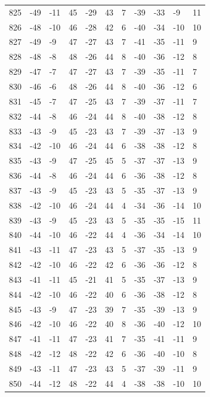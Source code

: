 \begin{table}[H]
\begin{tabular}{lllllllllll}
825 & -49 & -11 & 45 & -29 & 43 & 7 & -39 & -33 & -9 & 11 \\
826 & -48 & -10 & 46 & -28 & 42 & 6 & -40 & -34 & -10 & 10 \\
827 & -49 & -9 & 47 & -27 & 43 & 7 & -41 & -35 & -11 & 9 \\
828 & -48 & -8 & 48 & -26 & 44 & 8 & -40 & -36 & -12 & 8 \\
829 & -47 & -7 & 47 & -27 & 43 & 7 & -39 & -35 & -11 & 7 \\
830 & -46 & -6 & 48 & -26 & 44 & 8 & -40 & -36 & -12 & 6 \\
831 & -45 & -7 & 47 & -25 & 43 & 7 & -39 & -37 & -11 & 7 \\
832 & -44 & -8 & 46 & -24 & 44 & 8 & -40 & -38 & -12 & 8 \\
833 & -43 & -9 & 45 & -23 & 43 & 7 & -39 & -37 & -13 & 9 \\
834 & -42 & -10 & 46 & -24 & 44 & 6 & -38 & -38 & -12 & 8 \\
835 & -43 & -9 & 47 & -25 & 45 & 5 & -37 & -37 & -13 & 9 \\
836 & -44 & -8 & 46 & -24 & 44 & 6 & -36 & -38 & -12 & 8 \\
837 & -43 & -9 & 45 & -23 & 43 & 5 & -35 & -37 & -13 & 9 \\
838 & -42 & -10 & 46 & -24 & 44 & 4 & -34 & -36 & -14 & 10 \\
839 & -43 & -9 & 45 & -23 & 43 & 5 & -35 & -35 & -15 & 11 \\
840 & -44 & -10 & 46 & -22 & 44 & 4 & -36 & -34 & -14 & 10 \\
841 & -43 & -11 & 47 & -23 & 43 & 5 & -37 & -35 & -13 & 9 \\
842 & -42 & -10 & 46 & -22 & 42 & 6 & -36 & -36 & -12 & 8 \\
843 & -41 & -11 & 45 & -21 & 41 & 5 & -35 & -37 & -13 & 9 \\
844 & -42 & -10 & 46 & -22 & 40 & 6 & -36 & -38 & -12 & 8 \\
845 & -43 & -9 & 47 & -23 & 39 & 7 & -35 & -39 & -13 & 9 \\
846 & -42 & -10 & 46 & -22 & 40 & 8 & -36 & -40 & -12 & 10 \\
847 & -41 & -11 & 47 & -23 & 41 & 7 & -35 & -41 & -11 & 9 \\
848 & -42 & -12 & 48 & -22 & 42 & 6 & -36 & -40 & -10 & 8 \\
849 & -43 & -11 & 47 & -23 & 43 & 5 & -37 & -39 & -11 & 9 \\
850 & -44 & -12 & 48 & -22 & 44 & 4 & -38 & -38 & -10 & 10 \\

\end{tabular}
\end{table}
